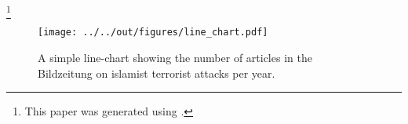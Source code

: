 \documentclass[11pt, a4paper, leqno]{article}
\begin{document}
 \footnote{This paper was generated using \citet{GaudeckerEconProjectTemplates}.}
%

\begin{figure}
   \caption{A simple line-chart showing the number of articles in the Bildzeitung on islamist terrorist attacks per year.}
  
 \texttt{[image: ../../out/figures/line\_chart.pdf]}

\end{figure}




{}





\end{document}
